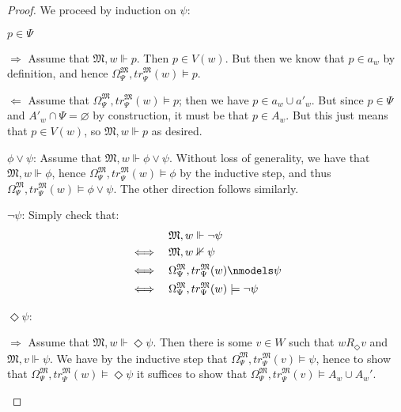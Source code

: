 \documentclass[11pt]{article}
\newcommand{\Pos}{\Diamond}
\begin{document}
 \begin{proof}
 We proceed by induction on $\psi$:
 \begin{peano}
 \item $p \in \Psi$
 \begin{peano}
 	\item $\Rightarrow$ Assume that $\mathfrak{M},w \Vdash p$. Then $p \in V(w)$.  But then we know that $p \in a_w$ by definition, and hence $\Omega_{\Psi}^\mathfrak{M}, tr_{\Psi}^\mathfrak{M}(w) \models p$.
	\item $\Leftarrow$ Assume that $\Omega_{\Psi}^\mathfrak{M}, tr_{\Psi}^\mathfrak{M}(w) \models p$; then we have $p \in a_w \cup a'_w$.  But since $p \in \Psi$ and $A'_w \cap \Psi = \varnothing$ by construction, it must be that $p \in A_w$.  But this just means that $p \in V(w)$, so $\mathfrak{M},w \Vdash p$ as desired.
 \end{peano}
 \item $\phi \vee \psi$:  Assume that $\mathfrak{M},w \Vdash \phi \vee \psi$.  Without loss of generality, we have that $\mathfrak{M},w \Vdash \phi$, hence $\Omega_{\Psi}^\mathfrak{M}, tr_{\Psi}^\mathfrak{M}(w) \models \phi$ by the inductive step, and thus $\Omega_{\Psi}^\mathfrak{M}, tr_{\Psi}^\mathfrak{M}(w) \models \phi \vee \psi$.  The other direction follows similarly.
 \item $\neg \psi$: Simply check that: \begin{align*}
 & \mathfrak{M},w \Vdash \neg\psi\\
 \iff\ \ \ & \mathfrak{M},w \nVdash \psi \\
  \iff\ \ \  & \Omega_{\Psi}^\mathfrak{M}, tr_{\Psi}^\mathfrak{M}(w) \nmodels \psi \\
  \iff\ \ \  & \Omega_{\Psi}^\mathfrak{M}, tr_{\Psi}^\mathfrak{M}(w) \models \neg \psi
 \end{align*}
 \item $\Pos \psi$: 
 \begin{peano}
	\item $\Rightarrow$ Assume that $\mathfrak{M},w \Vdash \Pos \psi$.  Then there is some $v \in W$ such that $w R_\Pos v$ and $\mathfrak{M}, v \Vdash \psi$.  We have by the inductive step that $\Omega_{\Psi}^\mathfrak{M}, tr_{\Psi}^\mathfrak{M}(v) \models \psi$, hence to show that $\Omega_{\Psi}^\mathfrak{M}, tr_{\Psi}^\mathfrak{M}(w) \models \Pos \psi$ it suffices to show that $\Omega_{\Psi}^\mathfrak{M}, tr_{\Psi}^\mathfrak{M}(v) \models A_w \cup A_w'$.
	

\end{peano}
\end{peano}
\end{proof}
\end{document}

